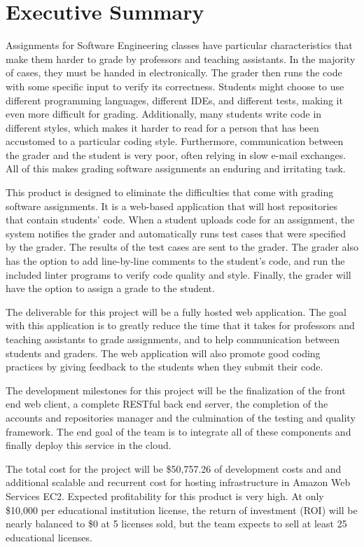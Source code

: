 \part*{Executive Summary}

Assignments for Software Engineering classes have particular characteristics
that make them harder to grade by professors and teaching assistants. In the
majority of cases, they must be handed in electronically. The grader then runs
the code with some specific input to verify its correctness. Students might
choose to use different programming languages, different IDEs, and different
tests, making it even more difficult for grading. Additionally, many students
write code in different styles, which makes it harder to read for a person
that has been accustomed to a particular coding style. Furthermore,
communication between the grader and the student is very poor, often relying
in slow e-mail exchanges.  All of this makes grading software assignments an
enduring and irritating task.

This product is designed to eliminate the difficulties that come with grading
software assignments. It is a web-based application that will host
repositories that contain students' code. When a student uploads code for an
assignment, the system notifies the grader and automatically runs test cases
that were specified by the grader. The results of the test cases are sent to
the grader. The grader also has the option to add line-by-line comments to the
student's code, and run the included linter programs to verify code quality
and style. Finally, the grader will have the option to assign a grade to the
student.

The deliverable for this project will be a fully hosted web application. The
goal with this application is to greatly reduce the time that it takes for
professors and teaching assistants to grade assignments, and to help
communication between students and graders. The web application will also
promote good coding practices by giving feedback to the students when they
submit their code.

The development milestones for this project will be the finalization of the
front end web client, a complete RESTful back end server, the completion of
the accounts and repositories manager and the culmination of the testing and
quality framework. The end goal of the team is to integrate all of these
components and finally deploy this service in the cloud.


The total cost for the project will be \$50,757.26 of development costs and
and additional scalable and recurrent cost for hosting infrastructure in
Amazon Web Services EC2. Expected profitability for this product is very high.
At only \$10,000 per educational institution license, the return of investment
(ROI) will be nearly balanced to \$0 at 5 licenses sold, but the team expects
to sell at least 25 educational licenses.
